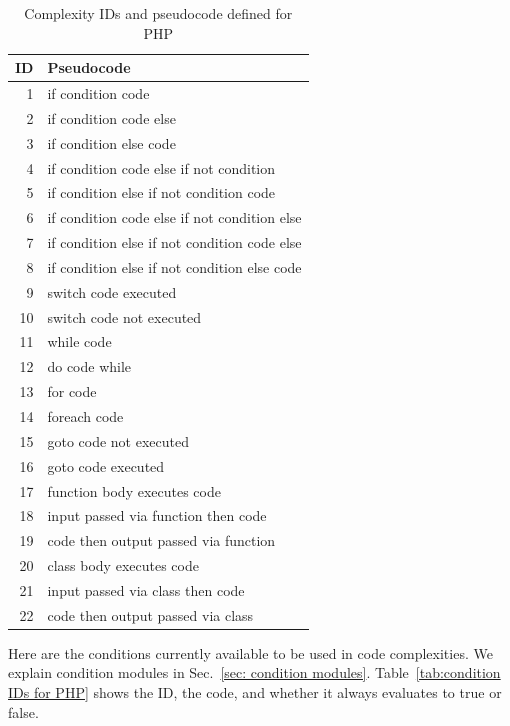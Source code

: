 \documentclass[12pt]{article}
\begin{document}
\begin{table}[H]
\centering
\caption{Complexity IDs and pseudocode defined for PHP}
\begin{tabular}{|r|l|}
\hline
\textbf{ID} & \textbf{Pseudocode} \\
\hline
 1 & if condition code \\
\hline
 2 & if condition code else \\
\hline
 3 & if condition else code \\
\hline
 4 & if condition code else if not condition \\
\hline
 5 & if condition else if not condition code \\
\hline
 6 & if condition code else if not condition else \\
\hline
 7 & if condition else if not condition code else \\
 \hline
 8 & if condition else if not condition else code \\
\hline
 9 & switch code executed \\
\hline
10 & switch code not executed \\
\hline
11 & while code \\
\hline

12 & do code while \\
\hline
13 & for code \\
\hline
14 & foreach code \\
\hline
15 & goto code not executed \\
\hline
16 & goto code executed \\
\hline
17 & function body executes code \\
\hline
18 & input passed via function then code \\
\hline
19 & code then output passed via function \\
\hline
20 & class body executes code \\
\hline
21 & input passed via class then code \\
\hline
22 & code then output passed via class \\
\hline
\end{tabular}
\label{tab:complexity IDs for PHP}
\end{table}


Here are the conditions currently available to be used in code complexities.
We explain condition modules in Sec.~\ref{sec: condition modules}.
Table~\ref{tab:condition IDs for PHP} shows the ID, the code, and whether it
always evaluates to true or false.
\end{document}
